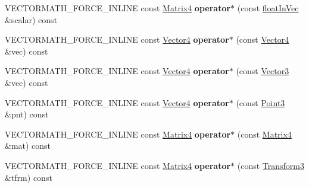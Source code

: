 \begin{DoxyCompactItemize}
\item 
\mbox{\label{classVectormath_1_1Aos_1_1Matrix4_ad2dd8780c3131b8f46f53fd8c3cfaf11}} 
V\+E\+C\+T\+O\+R\+M\+A\+T\+H\+\_\+\+F\+O\+R\+C\+E\+\_\+\+I\+N\+L\+I\+NE const \hyperlink{classVectormath_1_1Aos_1_1Matrix4}{Matrix4} {\bfseries operator$\ast$} (const \hyperlink{classVectormath_1_1floatInVec}{float\+In\+Vec} \&scalar) const
\item 
\mbox{\label{classVectormath_1_1Aos_1_1Matrix4_a059505de18285bdbf1f7803b1cf78ece}} 
V\+E\+C\+T\+O\+R\+M\+A\+T\+H\+\_\+\+F\+O\+R\+C\+E\+\_\+\+I\+N\+L\+I\+NE const \hyperlink{classVectormath_1_1Aos_1_1Vector4}{Vector4} {\bfseries operator$\ast$} (const \hyperlink{classVectormath_1_1Aos_1_1Vector4}{Vector4} \&vec) const
\item 
\mbox{\label{classVectormath_1_1Aos_1_1Matrix4_a55560ef07894bfa1086be365141c36a2}} 
V\+E\+C\+T\+O\+R\+M\+A\+T\+H\+\_\+\+F\+O\+R\+C\+E\+\_\+\+I\+N\+L\+I\+NE const \hyperlink{classVectormath_1_1Aos_1_1Vector4}{Vector4} {\bfseries operator$\ast$} (const \hyperlink{classVectormath_1_1Aos_1_1Vector3}{Vector3} \&vec) const
\item 
\mbox{\label{classVectormath_1_1Aos_1_1Matrix4_a93c124a39005bbd334e6eb3840029d54}} 
V\+E\+C\+T\+O\+R\+M\+A\+T\+H\+\_\+\+F\+O\+R\+C\+E\+\_\+\+I\+N\+L\+I\+NE const \hyperlink{classVectormath_1_1Aos_1_1Vector4}{Vector4} {\bfseries operator$\ast$} (const \hyperlink{classVectormath_1_1Aos_1_1Point3}{Point3} \&pnt) const
\item 
\mbox{\label{classVectormath_1_1Aos_1_1Matrix4_ac56e1d468061f123e02d53616c4506d0}} 
V\+E\+C\+T\+O\+R\+M\+A\+T\+H\+\_\+\+F\+O\+R\+C\+E\+\_\+\+I\+N\+L\+I\+NE const \hyperlink{classVectormath_1_1Aos_1_1Matrix4}{Matrix4} {\bfseries operator$\ast$} (const \hyperlink{classVectormath_1_1Aos_1_1Matrix4}{Matrix4} \&mat) const
\item 
\mbox{\label{classVectormath_1_1Aos_1_1Matrix4_aa673b08395ec454d01dc87e260886ee9}} 
V\+E\+C\+T\+O\+R\+M\+A\+T\+H\+\_\+\+F\+O\+R\+C\+E\+\_\+\+I\+N\+L\+I\+NE const \hyperlink{classVectormath_1_1Aos_1_1Matrix4}{Matrix4} {\bfseries operator$\ast$} (const \hyperlink{classVectormath_1_1Aos_1_1Transform3}{Transform3} \&tfrm) const

\end{DoxyCompactItemize}
